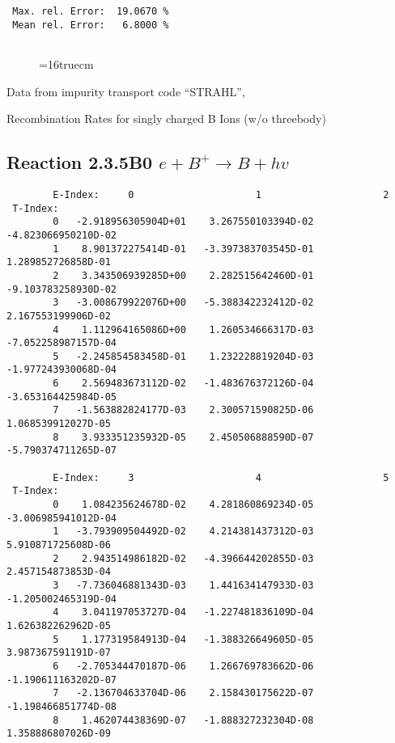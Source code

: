 \documentclass[12pt,dvipdfmx]{article}
\begin{document}
\begin{small}
\begin{verbatim}
 Max. rel. Error:  19.0670 %
 Mean rel. Error:   6.8000 %


\end{verbatim}\end{small}
\begin{figure} \label{2.3.4B1}
\epsfxsize=16truecm
\end{figure}
\newpage
Data from impurity transport code ``STRAHL'', \cite{kn:Behringer}

  Recombination Rates for singly charged B Ions (w/o threebody)
\subsection{
Reaction 2.3.5B0 $ e + B^+ \rightarrow B + hv $
}


\begin{small}\begin{verbatim}
        E-Index:     0                     1                     2
 T-Index:
        0   -2.918956305904D+01    3.267550103394D-02   -4.823066950210D-02
        1    8.901372275414D-01   -3.397383703545D-01    1.289852726858D-01
        2    3.343506939285D+00    2.282515642460D-01   -9.103783258930D-02
        3   -3.008679922076D+00   -5.388342232412D-02    2.167553199906D-02
        4    1.112964165086D+00    1.260534666317D-03   -7.052258987157D-04
        5   -2.245854583458D-01    1.232228819204D-03   -1.977243930068D-04
        6    2.569483673112D-02   -1.483676372126D-04   -3.653164425984D-05
        7   -1.563882824177D-03    2.300571590825D-06    1.068539912027D-05
        8    3.933351235932D-05    2.450506888590D-07   -5.790374711265D-07

        E-Index:     3                     4                     5
 T-Index:
        0    1.084235624678D-02    4.281860869234D-05   -3.006985941012D-04
        1   -3.793909504492D-02    4.214381437312D-03    5.910871725608D-06
        2    2.943514986182D-02   -4.396644202855D-03    2.457154873853D-04
        3   -7.736046881343D-03    1.441634147933D-03   -1.205002465319D-04
        4    3.041197053727D-04   -1.227481836109D-04    1.626382262962D-05
        5    1.177319584913D-04   -1.388326649605D-05    3.987367591191D-07
        6   -2.705344470187D-06    1.266769783662D-06   -1.190611163202D-07
        7   -2.136704633704D-06    2.158430175622D-07   -1.198466851774D-08
        8    1.462074438369D-07   -1.888327232304D-08    1.358886807026D-09


\end{verbatim}
\end{small}
\end{document}
